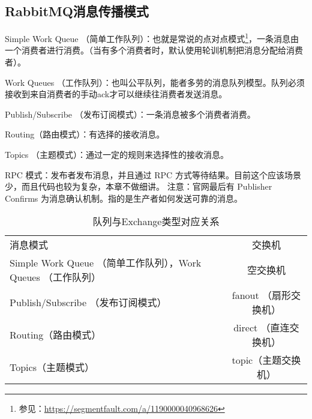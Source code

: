 \documentclass[../../../interview-questions.tex]{subfiles}
\begin{document}
\subsection{RabbitMQ消息传播模式}

Simple Work Queue （简单工作队列）：也就是常说的点对点模式\footnote{参见：\url{https://segmentfault.com/a/1190000040968626}}，一条消息由一个消费者进行消费。（当有多个消费者时，默认使用轮训机制把消息分配给消费者）。

Work Queues （工作队列）：也叫公平队列，能者多劳的消息队列模型。队列必须接收到来自消费者的手动ack才可以继续往消费者发送消息。

Publish/Subscribe （发布订阅模式）：一条消息被多个消费者消费。

Routing（路由模式）：有选择的接收消息。

Topics （主题模式）：通过一定的规则来选择性的接收消息。

RPC 模式：发布者发布消息，并且通过 RPC 方式等待结果。目前这个应该场景少，而且代码也较为复杂，本章不做细讲。
注意：官网最后有 Publisher Confirms 为消息确认机制。指的是生产者如何发送可靠的消息。


\begin{table}[htbp]
	\caption{队列与Exchange类型对应关系}
	\label{table:queueexchange}
	\begin{center}
		\begin{tabular}{p{6cm}c}
			\hline
			\multirow{1}{*}{消息模式}
			& \multicolumn{1}{c}{交换机} \\			
			\cline{1-2}
			Simple Work Queue （简单工作队列），Work Queues （工作队列） &  空交换机   \\
			\hline
			Publish/Subscribe （发布订阅模式） &  fanout （扇形交换机）  \\
			\hline
			Routing（路由模式） &  direct （直连交换机） \\
			\hline	
            Topics（主题模式） &  topic（主题交换机） \\
			\hline						
		\end{tabular}	
	\end{center}
\end{table}
\end{document}
